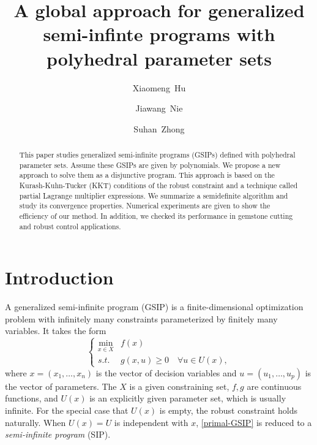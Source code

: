 \documentclass{amsart}
\theoremstyle{plain}
\newcommand{\st}{\mathit{s.t.}}
\newcommand{\be}{\begin{equation}}
\newcommand{\ee}{\end{equation}}
\numberwithin{equation}{section}
\begin{document}
	
	\title[GSIPs with polyhedral uncertainty]{A global approach for generalized 
		semi-infinte programs with polyhedral parameter sets}
	
	
	\author[Xaomeng Hu]{Xiaomeng~Hu}
	
	\author[Jiawang Nie]{Jiawang~Nie}
	\address{Xiaomeng Hu, Jiawang Nie, Department of Mathematics,
		University of California San Diego,
		9500 Gilman Drive, La Jolla, CA, USA, 92093.}
	
	
	\author[Suhan Zhong]{Suhan~Zhong} 
	\address{Suhan Zhong, Department of Mathematics,
		Texas A\&M University, College Station, TX, USA, 77843-3368.}
	
	
	
	
	
	
	\begin{abstract}
		This paper studies generalized semi-infinite programs (GSIPs) defined 
        with polyhedral parameter sets. Assume these GSIPs are given by polynomials.
		We propose a new approach to solve them as a disjunctive program.
        This approach is based on the Kurash-Kuhn-Tucker (KKT) conditions of the 
        robust constraint and a technique called partial Lagrange multiplier expressions.
        We summarize a semidefinite algorithm and study its convergence properties.
        Numerical experiments are given to show the efficiency of our method.
        In addition, we checked its performance in gemstone cutting and robust control applications. 
	\end{abstract}
	
	
	\maketitle
	
	
	\section{Introduction}\label{sec:Intro}
	
	A generalized semi-infinite program (GSIP) is a finite-dimensional optimization 
	problem with infinitely many constraints parameterized by finitely many variables. 
	It takes the form
	\be \label{primal-GSIP}
	\left\{
	\begin{array}{cl}
		\min\limits_{x\in X} & f(x)\\
		\st  &  g(x,u)\geq 0\quad\forall u\in U(x),
	\end{array}
	\right.
	\ee
	where $x = (x_1,\ldots, x_n)$ is the vector of decision variables
	and $u = (u_1,\ldots, u_p)$ is the vector of parameters.
	The $X$ is a given constraining set, $f, g$ are continuous functions, 
        and $U(x)$ is an explicitly given parameter set, which is usually infinite.
	For the special case that $U(x)$ is empty, the robust constraint holds naturally.
	When $U(x)=U$ is independent with $x$, 
	\eqref{primal-GSIP} is reduced to a {\it semi-infinite program} (SIP).
	
\end{document}
